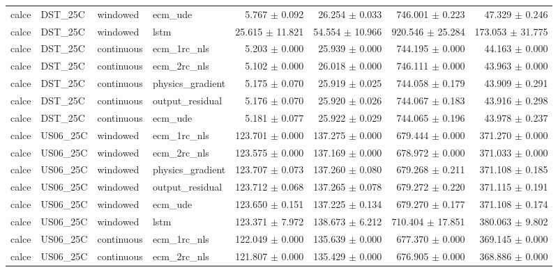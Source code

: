 \begin{longtable}{llllrrrr}
calce & DST\_25C & windowed & ecm\_ude & 5.767 $\pm$ 0.092 & 26.254 $\pm$ 0.033 & 746.001 $\pm$ 0.223 & 47.329 $\pm$ 0.246 \\
calce & DST\_25C & windowed & lstm & 25.615 $\pm$ 11.821 & 54.554 $\pm$ 10.966 & 920.546 $\pm$ 25.284 & 173.053 $\pm$ 31.775 \\
calce & DST\_25C & continuous & ecm\_1rc\_nls & 5.203 $\pm$ 0.000 & 25.939 $\pm$ 0.000 & 744.195 $\pm$ 0.000 & 44.163 $\pm$ 0.000 \\
calce & DST\_25C & continuous & ecm\_2rc\_nls & 5.102 $\pm$ 0.000 & 26.018 $\pm$ 0.000 & 746.111 $\pm$ 0.000 & 43.963 $\pm$ 0.000 \\
calce & DST\_25C & continuous & physics\_gradient & 5.175 $\pm$ 0.070 & 25.919 $\pm$ 0.025 & 744.058 $\pm$ 0.179 & 43.909 $\pm$ 0.291 \\
calce & DST\_25C & continuous & output\_residual & 5.176 $\pm$ 0.070 & 25.920 $\pm$ 0.026 & 744.067 $\pm$ 0.183 & 43.916 $\pm$ 0.298 \\
calce & DST\_25C & continuous & ecm\_ude & 5.181 $\pm$ 0.077 & 25.922 $\pm$ 0.029 & 744.065 $\pm$ 0.196 & 43.978 $\pm$ 0.237 \\
calce & US06\_25C & windowed & ecm\_1rc\_nls & 123.701 $\pm$ 0.000 & 137.275 $\pm$ 0.000 & 679.444 $\pm$ 0.000 & 371.270 $\pm$ 0.000 \\
calce & US06\_25C & windowed & ecm\_2rc\_nls & 123.575 $\pm$ 0.000 & 137.169 $\pm$ 0.000 & 678.972 $\pm$ 0.000 & 371.033 $\pm$ 0.000 \\
calce & US06\_25C & windowed & physics\_gradient & 123.707 $\pm$ 0.073 & 137.260 $\pm$ 0.080 & 679.268 $\pm$ 0.211 & 371.108 $\pm$ 0.185 \\
calce & US06\_25C & windowed & output\_residual & 123.712 $\pm$ 0.068 & 137.265 $\pm$ 0.078 & 679.272 $\pm$ 0.220 & 371.115 $\pm$ 0.191 \\
calce & US06\_25C & windowed & ecm\_ude & 123.650 $\pm$ 0.151 & 137.225 $\pm$ 0.134 & 679.270 $\pm$ 0.177 & 371.108 $\pm$ 0.174 \\
calce & US06\_25C & windowed & lstm & 123.371 $\pm$ 7.972 & 138.673 $\pm$ 6.212 & 710.404 $\pm$ 17.851 & 380.063 $\pm$ 9.802 \\
calce & US06\_25C & continuous & ecm\_1rc\_nls & 122.049 $\pm$ 0.000 & 135.639 $\pm$ 0.000 & 677.370 $\pm$ 0.000 & 369.145 $\pm$ 0.000 \\
calce & US06\_25C & continuous & ecm\_2rc\_nls & 121.807 $\pm$ 0.000 & 135.429 $\pm$ 0.000 & 676.905 $\pm$ 0.000 & 368.886 $\pm$ 0.000 \\

\end{longtable}
